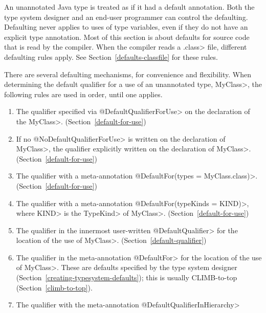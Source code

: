 

An unannotated
Java type is treated as if it had a default annotation.
Both the type system designer and an end-user programmer can control the defaulting.
Defaulting never applies to uses of type variables, even if they do not
have an explicit type annotation.
Most of this section is about defaults for source code that is read by
the compiler.  When the compiler reads a \<.class> file, different
defaulting rules apply.
See Section~\ref{defaults-classfile} for these rules.

There are several defaulting mechanisms, for convenience and flexibility.
When determining the default qualifier for a use of an unannotated type, \<MyClass>, the following
rules are used in order, until one applies.

\begin{enumerate}
\item
  The qualifier specified via \<@DefaultQualifierForUse> on the declaration of the \<MyClass>.
  (Section~\ref{default-for-use})
\item
  If no \<@NoDefaultQualifierForUse> is written on the declaration of \<MyClass>, the qualifier
  explicitly written on the declaration of \<MyClass>. (Section~\ref{default-for-use})
\item
  The qualifier with a meta-annotation \<@DefaultFor(types = MyClass.class)>. (Section~\ref{default-for-use})
\item
  The qualifier with a meta-annotation \<@DefaultFor(typeKinds = KIND)>, where \<KIND> is the
  \<TypeKind> of \<MyClass>. (Section~\ref{default-for-use})
\item
  The qualifier in the innermost user-written \<@DefaultQualifier> for the location of the use of \<MyClass>.
  (Section~\ref{default-qualifier})
\item
  The qualifier in the meta-annotation \<@DefaultFor> for the location of the use of \<MyClass>.
  These are defaults specified by the type system designer (Section~\ref{creating-typesystem-defaults});
  this is usually CLIMB-to-top (Section~\ref{climb-to-top}).
\item
  The qualifier with the meta-annotation \<@DefaultQualifierInHierarchy>
\end{enumerate}

